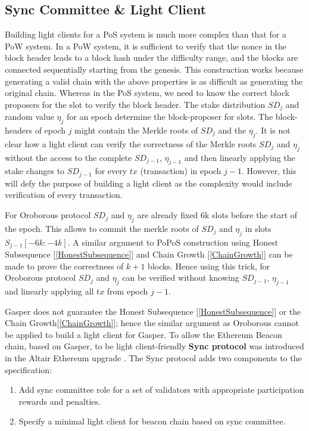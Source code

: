\documentclass[a4paper,11pt,oneside]{article}
\theoremstyle{definition}
\begin{document}
  \subsection{Sync Committee \& Light Client}
  Building light clients for a PoS system is much more complex than that for a PoW system. In a PoW system, it is sufficient to verify that the nonce in the block header leads to a block hash under the difficulty range, and the blocks are connected sequentially starting from the genesis. This construction works because generating a valid chain with the above properties is as difficult as generating the original chain. Whereas in the PoS system, we need to know the correct block proposers for the slot to verify the block header. The stake distribution $SD_j$ and random value $\eta_j$ for an epoch determine the block-proposer for slots. The block-headers of epoch $j$ might contain the Merkle roots of $SD_j$ and the $\eta_j$. It is not clear how a light client can verify the correctness of the Merkle roots $SD_j$ and $\eta_j$ without the access to the complete $SD_{j - 1}$, $\eta_{j - 1}$ and then linearly applying the stake changes to $SD_{j - 1}$ for every $tx$ (transaction) in epoch $j - 1$. However, this will defy the purpose of building a light client as the complexity would include verification of every transaction. 
  
  For Oroborous protocol $SD_j$ and $\eta_j$ are already fixed 6k slots before the start of the epoch. This allows to commit the merkle roots of $SD_j$ and $\eta_j$ in slots $S_{j - 1}[-6k: -4k]$. A similar argument to PoPoS construction using Honest Subsequence [\ref{HonestSubsequence}] and Chain Growth [\ref{ChainGrowth}] can be made to prove the correctness of $k + 1$ blocks. Hence using this trick, for Oroborous protocol $SD_j$ and $\eta_j$ can be verified without knowing $SD_{j - 1}$, $\eta_{j - 1}$ and linearly applying all $tx$ from epoch $j - 1$. 
  
  Gasper does not guarantee the Honest Subsequence [\ref{HonestSubsequence}] or the Chain Growth[\ref{ChainGrowth}]; hence the similar argument as Oroborous cannot be applied to build a light client for Gasper. To allow the Ethereum Beacon chain, based on Gasper, to be light client-friendly \textbf{Sync protocol} was introduced in the Altair Ethereum upgrade \cite{EthereumConcensusSpecs}. The Sync protocol adds two components to the specification:
  \begin{enumerate}
      \item Add sync committee role for a set of validators with appropriate participation rewards and penalties.
      \item Specify a minimal light client for beacon chain based on sync committee.
  \end{enumerate}
  
\end{document}
